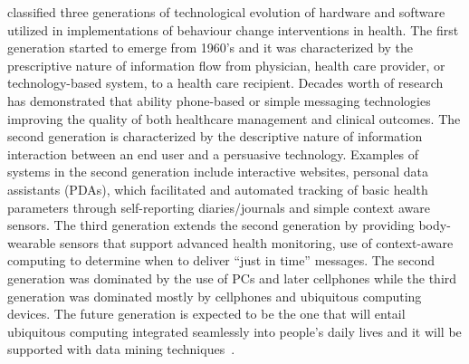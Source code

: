 \cite{chatterjee2009healthy} classified three generations  of technological evolution of hardware and software utilized in implementations of behaviour change interventions in health. The first generation started to emerge from 1960's and it was characterized by the prescriptive nature of information flow from physician, health care provider, or technology-based system, to a health care recipient. Decades worth of research has demonstrated that ability phone-based or simple messaging technologies improving the quality of both healthcare management and clinical outcomes. The second generation is characterized by the descriptive nature of information interaction between an end user and a persuasive technology. Examples of systems in the second generation include interactive websites, personal data assistants (PDAs), which facilitated and automated tracking of basic health parameters through self-reporting diaries/journals and simple context aware sensors. The third generation extends the second generation by providing body-wearable sensors that support advanced health monitoring, use of context-aware computing to determine when to deliver “just in time” messages.  The second generation was dominated by the use of PCs and later cellphones while the third generation was dominated mostly by cellphones and ubiquitous computing devices. The future generation is expected to be the one that will entail ubiquitous computing integrated seamlessly into people's daily lives and it will be supported with data mining techniques~\citep{chatterjee2009healthy}.

